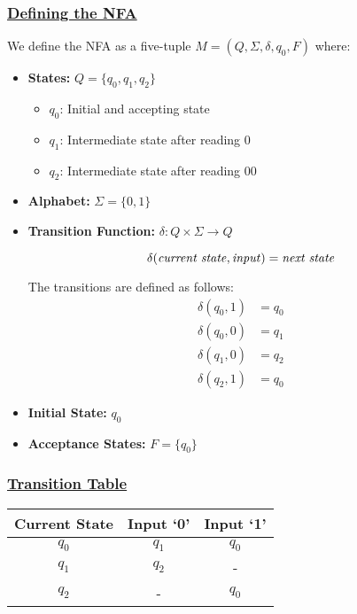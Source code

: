 \documentclass[12pt]{article}
\begin{document}
	\subsubsection*{\underline{Defining the NFA}} 
	We define the NFA as a five-tuple \(M = (Q, \Sigma, \delta, q_0, F)\) where: 
	
	\begin{itemize} 
		\item \textbf{States:} \(Q = \{q_0, q_1, q_2\}\)
		\begin{itemize} 
			\item \(q_0\): Initial and accepting state 
			\item \(q_1\): Intermediate state after reading 0
			\item \(q_2\): Intermediate state after reading 00
		\end{itemize} 
		\item \textbf{Alphabet:} \(\Sigma = \{0,1\}\) 
		\item \textbf{Transition Function:} \(\delta: Q \times \Sigma \to Q\)
		\begin{mdframed}[linewidth=1pt] 
			\[\delta(\text{\textit{current state}}, \text{\textit{input}}) = \text{\textit{next state}}\] 
		\end{mdframed} 
		The transitions are defined as follows: 
		\begin{align*} 
			\delta(q_0, 1) &= q_0 \\ 
			\delta(q_0, 0) &= q_1 \\ 
			\delta(q_1, 0) &= q_2 \\ 
			\delta(q_2, 1) &= q_0 
		\end{align*} 
		\item \textbf{Initial State:} \(q_0\) 
		\item \textbf{Acceptance States:} \(F = \{q_0\}\) 
	\end{itemize} 
	
	\subsubsection*{\underline{Transition Table}} 
	\begin{center} 
		\begin{tabular}{ccc} 
			\toprule 
			\textbf{Current State} & \textbf{Input `0'} & \textbf{Input `1'} \\ 
			\midrule 
			$q_0$ & $q_1$ & $q_0$ \\ 
			$q_1$ & $q_2$ & - \\ 
			$q_2$ & - & $q_0$ \\ 
			\bottomrule 
		\end{tabular} 
	\end{center} 
	 
\end{document}
